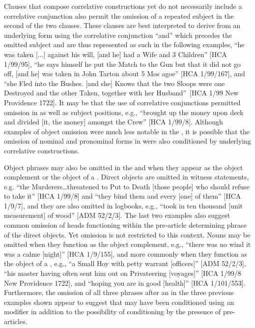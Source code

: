Clauses that compose correlative constructions yet do not necessarily include a correlative conjunction also permit the omission of a repeated  subject in the second of the two clauses. These clauses are best interpreted to derive from an underlying form using the correlative conjunction “and” which precedes the omitted  subject and are thus represented as such in the following examples, “he was taken [...] against his will, [and he] had a Wife and 3 Children” [HCA 1/99/95], “he says himself he put the Match to the Gun but that it did not go off, [and he] was taken in John Tarton about 5 Mos agoe” [HCA 1/99/167], and “she Fled into the Bushes. [and she] Knows that the two Sloops were one Destroyed and the other Taken, together with her Husband”~[HCA 1/99 New Providence 1722]. It may be that the use of correlative conjunctions permitted  omission in  as well as subject positions, e.g., “brought up the money upon deck and divided [it, the money] amongst the Crew” [HCA 1/99/8]. Although examples of object omission were much less notable in the , it is possible that the omission of nominal and pronominal  forms in  were also conditioned by underlying correlative constructions. 

Object  phrases may also be omitted in the  and when they appear as the object complement or the object of a . Direct objects are omitted in witness statements, e.g. “the Murderers…threatened to Put to Death [those people] who should refuse to take it” [HCA 1/99/8] and “they bind them and every [one] of them” [HCA 1/9/7], and they are also omitted in logbooks, e.g., “took in ten thousand [unit measurement] of wood” [ADM 52/2/3]. The last two examples also suggest common omission of  heads functioning within the pre-article determining phrase of the direct objects. Yet omission is not restricted to this context. Nouns may be omitted when they function as the object complement, e.g., “there was no wind it was a calme [night]” [HCA 1/9/155], and more commonly when they function as the object of a , e.g., “a Small Hoy with petty warrant [officers]” [ADM 52/2/3], “his master having often sent him out on Privateering [voyages]” [HCA 1/99/8 New Providence 1722], and “hoping you are in good [health]” [HCA 1/101/553]. Furthermore, the omission of all three  phrases after an  in the three previous examples shown appear to suggest that  may have been conditioned using an  modifier in addition to the possibility of conditioning by the presence of pre-articles. 

